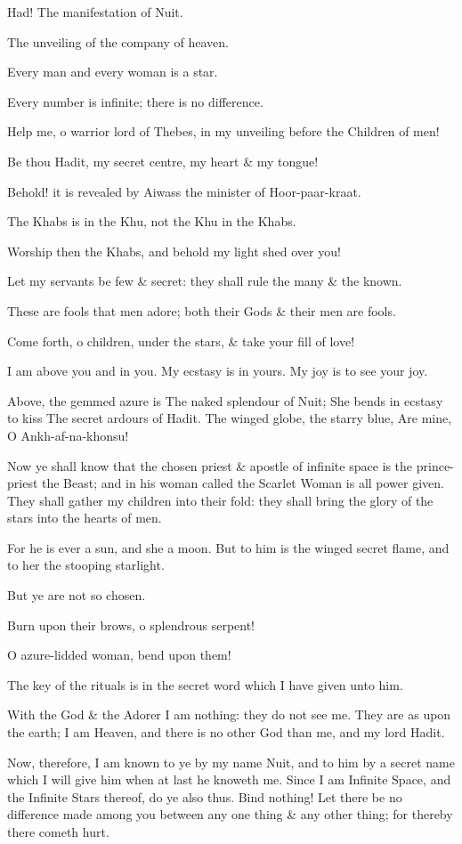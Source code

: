 Had! The manifestation of Nuit.

The unveiling of the company of heaven.

Every man and every woman is a star.

Every number is infinite; there is no difference.

Help me, o warrior lord of Thebes, in my unveiling before the Children of men!

Be thou Hadit, my secret centre, my heart \& my tongue!

Behold! it is revealed by Aiwass the minister of Hoor-paar-kraat.

The Khabs is in the Khu, not the Khu in the Khabs.

Worship then the Khabs, and behold my light shed over you!

Let my servants be few \& secret: they shall rule the many \& the known.

These are fools that men adore; both their Gods \& their men are fools.

Come forth, o children, under the stars, \& take your fill of love!

I am above you and in you. My ecstasy is in yours. My joy is to see your joy.

Above, the gemmed azure is
The naked splendour of Nuit;
She bends in ecstasy to kiss
The secret ardours of Hadit.
The winged globe, the starry blue,
Are mine, O Ankh-af-na-khonsu!

Now ye shall know that the chosen priest \& apostle of infinite space is the prince-priest the Beast; and in his woman called the Scarlet Woman is all power given. They shall gather my children into their fold: they shall bring the glory of the stars into the hearts of men.

For he is ever a sun, and she a moon. But to him is the winged secret flame, and to her the stooping starlight.

But ye are not so chosen.

Burn upon their brows, o splendrous serpent!

O azure-lidded woman, bend upon them!

The key of the rituals is in the secret word which I have given unto him.

With the God \& the Adorer I am nothing: they do not see me. They are as upon the earth; I am Heaven, and there is no other God than me, and my lord Hadit.

Now, therefore, I am known to ye by my name Nuit, and to him by a secret name which I will give him when at last he knoweth me. Since I am Infinite Space, and the Infinite Stars thereof, do ye also thus. Bind nothing! Let there be no difference made among you between any one thing \& any other thing; for thereby there cometh hurt.

